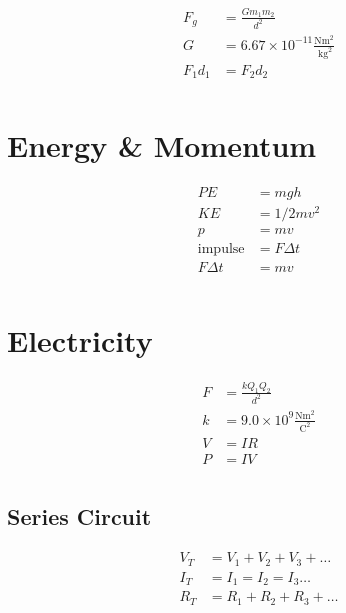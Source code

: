 \documentclass[10pt]{ctexart}
\begin{document}
\begin{multicols}{2}
    \begin{align*}
        F_{g}       & = \frac{G m_{1} m_{2}}{d^{2}}                                   \\
        G           & = 6.67 \times 10^{-11} \frac{\mathrm{Nm}^{2}}{\mathrm{~kg}^{2}} \\
        F_{1} d_{1} & = F_{2} d_{2}                                                   \\
    \end{align*}

    \section{Energy \& Momentum}

    \begin{align*}
        P E              & = m g h         \\
        K E              & = 1 / 2 m v^{2} \\
        p                & = m v           \\
        \textrm{impulse} & = F \Delta t    \\
        F \Delta t       & = m v           \\
    \end{align*}


    \newpage

    \section{Electricity}

    \begin{align*}
        F & = \frac{k Q_{1} Q_{2}}{d^{2}}                              \\
        k & = 9.0 \times 10^{9} \frac{\mathrm{Nm}^{2}}{\mathrm{C}^{2}} \\
        V & = I R                                                      \\
        P & = I V                                                      \\
    \end{align*}

    \subsection*{Series Circuit}

    \begin{align*}
        V_{T} & = V_{1}+V_{2}+V_{3}+\ldots \\
        I_{T} & = I_{1}=I_{2}=I_{3} \ldots \\
        R_{T} & = R_{1}+R_{2}+R_{3}+\ldots \\
    \end{align*}


\end{multicols}
\end{document}
